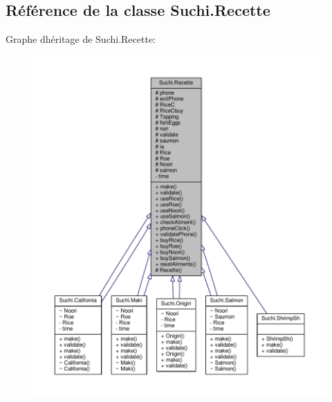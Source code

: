 \hypertarget{classSuchi_1_1Recette}{}\subsection{Référence de la classe Suchi.\+Recette}
\label{classSuchi_1_1Recette}


Graphe d\textquotesingle{}héritage de Suchi.\+Recette\+:\nopagebreak
\begin{figure}[H]
\begin{center}
\leavevmode
\includegraphics[width=350pt]{classSuchi_1_1Recette__inherit__graph}
\end{center}
\end{figure}


